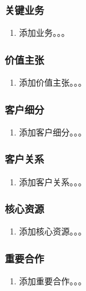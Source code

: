 \documentclass[a4paper]{ctexart}
\begin{document}
\subsubsection{关键业务}

\begin{enumerate}[label=\alph*.]
  \item 添加业务。。。
\end{enumerate}

\subsubsection{价值主张}

\begin{enumerate}[label=\alph*.]
  \item 添加价值主张。。。
\end{enumerate}

\subsubsection{客户细分}

\begin{enumerate}[label=\alph*.]
  \item 添加客户细分。。。
\end{enumerate}

\subsubsection{客户关系}

\begin{enumerate}[label=\alph*.]
  \item 添加客户关系。。。
\end{enumerate}

\subsubsection{核心资源}

\begin{enumerate}[label=\alph*.]
  \item 添加核心资源。。。
\end{enumerate}

\subsubsection{重要合作}

\begin{enumerate}[label=\alph*.]
  \item 添加重要合作。。。
\end{enumerate}
\end{document}
